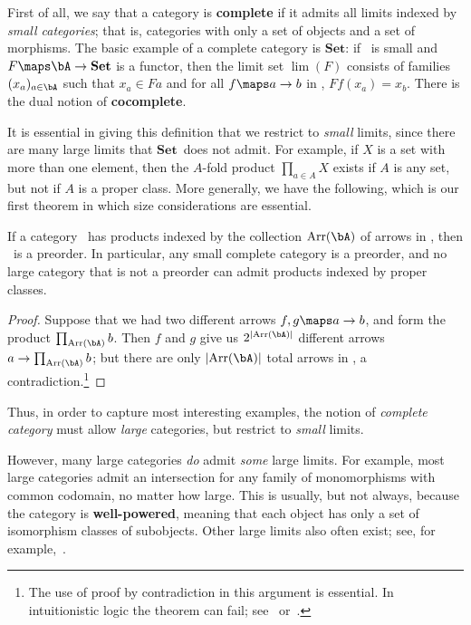 \documentclass{amsart}
\newcommand{\Set}{\ensuremath{\mathbf{Set}}}
\begin{document}
First of all, we say that a category is \textbf{complete} if it admits
all limits indexed by \emph{small categories}; that is, categories
with only a set of objects and a set of morphisms.  The basic example
of a complete category is \Set: if \bA\ is small and $F\maps
\bA\to\Set$ is a functor, then the limit set $\lim(F)$ consists of
families $(x_a)_{a\in\bA}$ such that $x_a\in Fa$ and for all $f\maps
a\to b$ in \bA, $Ff(x_a)=x_b$.  There is the dual notion of
\textbf{cocomplete}.

It is essential in giving this definition that we restrict to
\emph{small} limits, since there are many large limits that \Set\ does
not admit.  For example, if $X$ is a set with more than one element,
then the $A$-fold product $\prod_{a\in A} X$ exists if $A$ is any set,
but not if $A$ is a proper class.  More generally, we have the
following, which is our first theorem in which size considerations are
essential.

\begin{thm}\label{thm:small-complete}
  If a category \bA\ has products indexed by the collection
  $\mathrm{Arr}(\bA)$ of arrows in \bA, then \bA\ is a preorder.  In
  particular, any small complete category is a preorder, and no large
  category that is not a preorder can admit products indexed by proper
  classes.
\end{thm}
\begin{proof}
  Suppose that we had two different arrows $f,g\maps a\to b$, and form
  the product $\prod_{\mathrm{Arr}(\bA)} b$.  Then $f$ and $g$ give us
  $2^{|\mathrm{Arr}(\bA)|}$ different arrows $a\to
  \prod_{\mathrm{Arr}(\bA)} b$; but there are only
  ${|\mathrm{Arr}(\bA)|}$ total arrows in \bA, a
  contradiction.\footnote{The use of proof by contradiction in this
    argument is essential.  In intuitionistic logic the theorem can
    fail; see~\cite{hyland:small-cplt}
    or~\cite[Ch.~24]{mclarty:ecat-etop}.}
\end{proof}

Thus, in order to capture most interesting examples, the notion of
\emph{complete category} must allow \emph{large} categories, but
restrict to \emph{small} limits.

However, many large categories \emph{do} admit \emph{some} large
limits.  For example, most large categories admit an intersection for
any family of monomorphisms with common codomain, no matter how large.
This is usually, but not always, because the category is
\textbf{well-powered}, meaning that each object has only a set of
isomorphism classes of subobjects.  Other large limits also often
exist; see, for example,~\cite{kelly:totality,kk:large-lim}.
\end{document}
